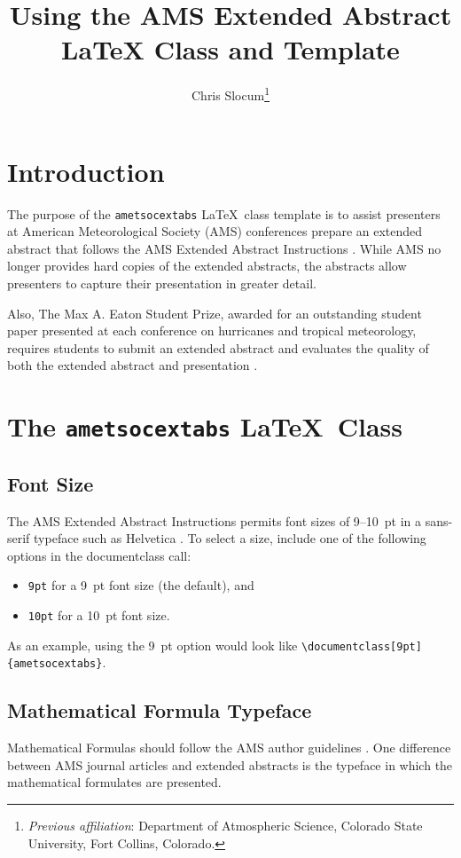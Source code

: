\documentclass[9pt]{ametsocextabs}
\title{Using the AMS Extended Abstract LaTeX Class and Template}
\author{Chris Slocum\aff{a}\thanks{\textit{Previous affiliation}: Department of Atmospheric Science, Colorado State University, Fort Collins, Colorado.}\correspondingauthor{Chris Slocum, \url{https://github.com/CSlocumWX/}}
}
\affiliation{\aff{a}{Fort Collins, Colorado}}
\begin{document}
\maketitle
\section{Introduction}
The purpose of the \texttt{ametsocextabs} \LaTeX\ class
template is to assist presenters at American Meteorological Society
(AMS) conferences prepare an extended abstract that follows the AMS
Extended Abstract Instructions \citep{AMS2025abs}. While AMS no
longer provides hard copies of the extended abstracts, the abstracts
allow presenters to capture their presentation in greater detail.

Also, The Max A. Eaton Student Prize, awarded for an outstanding
student paper presented at each conference on hurricanes and tropical
meteorology, requires students to submit an extended abstract and
evaluates the quality of both the extended abstract and presentation
\citep{AMS2025student, AMS2025Eaton}.

\section{The \lowercase{\texttt{ametsocextabs}} \LaTeX\ Class}

\subsection{Font Size}

The AMS Extended Abstract Instructions permits font sizes of 9--10~pt
in a sans-serif typeface such as Helvetica \citep{AMS2025abs}.
To select a size, include one of the following options in the
documentclass call:
\begin{itemize}
    \item \texttt{9pt} for a 9~pt font size (the default), and
    \item \texttt{10pt} for a 10~pt font size.
\end{itemize}
As an example, using the 9~pt option would look like
\texttt{\textbackslash documentclass[9pt]\{ametsocextabs\}}.

\subsection{Mathematical Formula Typeface}
Mathematical Formulas should follow the AMS author guidelines
\citep{AMS2025math}. One difference between AMS journal articles
and extended abstracts is the typeface in which the mathematical
formulates are presented.
\end{document}
